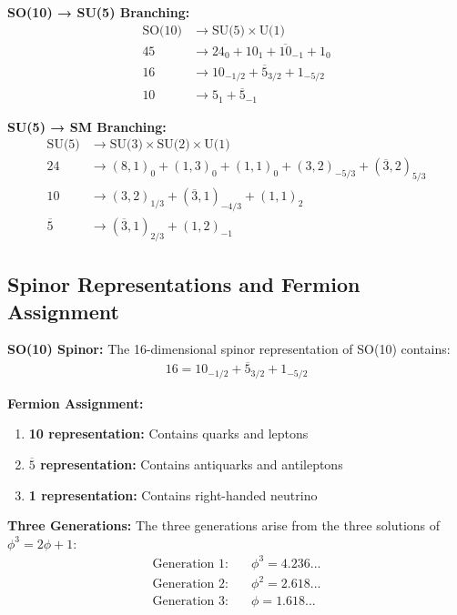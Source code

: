 \documentclass[11pt]{article}
\theoremstyle{definition}
\newcommand{\goldenratio}{\phi}
\begin{document}
\textbf{SO(10) → SU(5) Branching:}
\begin{align}
\text{SO(10)} &\to \text{SU(5)} \times \text{U(1)} \\
45 &\to 24_0 + 10_1 + \overline{10}_{-1} + 1_0 \\
16 &\to 10_{-1/2} + \overline{5}_{3/2} + 1_{-5/2} \\
10 &\to 5_1 + \overline{5}_{-1}
\end{align}

\textbf{SU(5) → SM Branching:}
\begin{align}
\text{SU(5)} &\to \text{SU(3)} \times \text{SU(2)} \times \text{U(1)} \\
24 &\to (8, 1)_0 + (1, 3)_0 + (1, 1)_0 + (3, 2)_{-5/3} + (\overline{3}, 2)_{5/3} \\
10 &\to (3, 2)_{1/3} + (\overline{3}, 1)_{-4/3} + (1, 1)_2 \\
\overline{5} &\to (\overline{3}, 1)_{2/3} + (1, 2)_{-1}
\end{align}

\subsection{Spinor Representations and Fermion Assignment}

\textbf{SO(10) Spinor:}
The 16-dimensional spinor representation of SO(10) contains:
\begin{align}
16 = 10_{-1/2} + \overline{5}_{3/2} + 1_{-5/2}
\end{align}

\textbf{Fermion Assignment:}
\begin{enumerate}
\item \textbf{10 representation:} Contains quarks and leptons
\item \textbf{$\overline{5}$ representation:} Contains antiquarks and antileptons
\item \textbf{1 representation:} Contains right-handed neutrino
\end{enumerate}

\textbf{Three Generations:}
The three generations arise from the three solutions of $\goldenratio^3 = 2\goldenratio + 1$:
\begin{align}
\text{Generation 1:} \quad &\goldenratio^3 = 4.236... \\
\text{Generation 2:} \quad &\goldenratio^2 = 2.618... \\
\text{Generation 3:} \quad &\goldenratio = 1.618...
\end{align}
\end{document}
